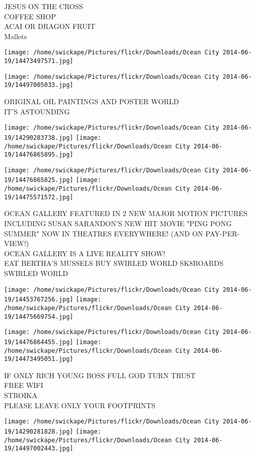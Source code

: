 \documentclass[10pt,letterpaper]{article}
\begin{document}
JESUS ON THE CROSS\\
COFFEE SHOP\\
ACAI OR DRAGON FRUIT\\
Mallets
\pagebreak

\texttt{[image: /home/swickape/Pictures/flickr/Downloads/Ocean City 2014-06-19/14473497571.jpg]}

\vspace{0.25in}
\texttt{[image: /home/swickape/Pictures/flickr/Downloads/Ocean City 2014-06-19/14497005033.jpg]}

ORIGINAL OIL PAINTINGS AND POSTER WORLD\\
IT'S ASTOUNDING
\pagebreak

\texttt{[image: /home/swickape/Pictures/flickr/Downloads/Ocean City 2014-06-19/14290283738.jpg]}
\texttt{[image: /home/swickape/Pictures/flickr/Downloads/Ocean City 2014-06-19/14476865895.jpg]}

\texttt{[image: /home/swickape/Pictures/flickr/Downloads/Ocean City 2014-06-19/14476865825.jpg]}
\texttt{[image: /home/swickape/Pictures/flickr/Downloads/Ocean City 2014-06-19/14475571572.jpg]}

OCEAN GALLERY FEATURED IN 2 NEW MAJOR MOTION PICTURES INCLUDING SUSAN SARANDON'S NEW HIT MOVIE "PING PONG SUMMER" NOW IN THEATRES EVERYWHERE!  (AND ON PAY{-}PER{-}VIEW!)\\
OCEAN GALLERY IS A LIVE REALITY SHOW!\\
EAT BERTHA'S MUSSELS BUY SWIRLED WORLD SK8BOARDS\\
SWIRLED WORLD
\pagebreak

\texttt{[image: /home/swickape/Pictures/flickr/Downloads/Ocean City 2014-06-19/14453767256.jpg]}
\texttt{[image: /home/swickape/Pictures/flickr/Downloads/Ocean City 2014-06-19/14475669754.jpg]}

\texttt{[image: /home/swickape/Pictures/flickr/Downloads/Ocean City 2014-06-19/14476864455.jpg]}
\texttt{[image: /home/swickape/Pictures/flickr/Downloads/Ocean City 2014-06-19/14473495051.jpg]}

IF ONLY RICH YOUNG BOSS FULL GOD TURN TRUST\\
FREE WIFI\\
STROIKA\\
PLEASE LEAVE ONLY YOUR FOOTPRINTS
\pagebreak

\texttt{[image: /home/swickape/Pictures/flickr/Downloads/Ocean City 2014-06-19/14290281828.jpg]}
\texttt{[image: /home/swickape/Pictures/flickr/Downloads/Ocean City 2014-06-19/14497002443.jpg]}
\end{document}
